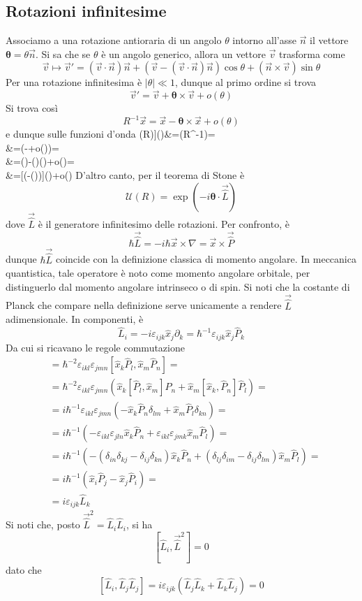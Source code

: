 \documentclass[a4paper, 11pt]{article}
\newcommand{\op}{\hat}
\newcommand{\Op}[1]{\vec{\hat{#1}}}
\def\bal#1\eal{\begin{align*}#1\end{align*}}
\newcommand{\1}{\mathbbm{1}}
\begin{document}
	\subsection{Rotazioni infinitesime}
	Associamo a una rotazione antioraria di un angolo $\theta$ intorno all'asse $\vec{n}$ il vettore $\bm{\theta}=\theta\vec{n}$. Si sa che se $\theta$ è un angolo generico, allora un vettore $\vec{v}$ trasforma come
	\[\vec v\mapsto\vec{v}'=(\vec{v}\cdot\vec{n})\vec{n}+(\vec{v}-(\vec{v}\cdot\vec{n})\vec{n})\cos\theta+(\vec{n}\times\vec{v})\sin\theta\]
	Per una rotazione infinitesima è $|\theta|\ll1$, dunque al primo ordine si trova
	\[\vec{v}'=\vec{v}+\bm{\theta}\times\vec{v}+o(\theta)\]
	Si trova così
	\[R^{-1}\vec{x}=\vec{x}-\bm{\theta}\times\vec{x}+o(\theta)\]
	e dunque sulle funzioni d'onda
	\bal
	[(R)\psi]()&=\psi(R^{-1})=\\&=\psi(-\bm\theta\times{}+o(\theta))=\\&=\psi()-(\bm\theta\times{})\cdot\nabla\psi()+o(\theta)=\\&=[(\1-\bm\theta\cdot(\times\nabla))\psi]()+o(\theta)
	\eal
	D'altro canto, per il teorema di Stone è
	\[\mathcal{U}(R)=\exp(-i\bm\theta\cdot\Op{L})\]
	dove $\Op{L}$ è il generatore infinitesimo delle rotazioni. Per confronto, è
	\[\hbar\Op{L}=-i\hbar\vec{x}\times\nabla=\vec{x}\times\Op{P}\]
	dunque $\hbar\Op{L}$ coincide con la definizione classica di momento angolare. In meccanica quantistica, tale operatore è noto come momento angolare orbitale, per distinguerlo dal momento angolare intrinseco o di spin. Si noti che la costante di Planck che compare nella definizione serve unicamente a rendere $\Op{L}$ adimensionale. In componenti, è
	\[\op L_i=-i\varepsilon_{ijk}\op x_j\partial_k=\hbar^{-1}\varepsilon_{ijk}\op x_j\op P_k\]
	Da cui si ricavano le regole commutazione
	\begin{align}
	[\op L_i,\op L_j]&=\hbar^{-2}\varepsilon_{ikl}\varepsilon_{jmn}[\op x_k\op P_l,\op x_m\op P_n]=\nonumber\\&=\hbar^{-2}\varepsilon_{ikl}\varepsilon_{jmn}\left(\op x_k[\op P_l,\op x_m]\op P_n+\op x_m[\op x_k,\op P_n]\op P_l\right)=\nonumber\\&=i\hbar^{-1}\varepsilon_{ikl}\varepsilon_{jmn}(-\op x_k\op P_n\delta_{lm}+\op x_m\op P_l\delta_{kn})=\nonumber\\&=i\hbar^{-1}(-\varepsilon_{ikl}\varepsilon_{jln}\op x_k\op P_n+\varepsilon_{ikl}\varepsilon_{jmk}\op x_m\op P_l)=\nonumber\\&=i\hbar^{-1}(-(\delta_{in}\delta_{kj}-\delta_{ij}\delta_{kn})\op x_k\op P_n+(\delta_{lj}\delta_{im}-\delta_{ij}\delta_{lm})\op x_m\op P_l)=\nonumber\\&=i\hbar^{-1}(\op x_i\op P_j-\op x_j\op P_i)=\nonumber\\&=i\varepsilon_{ijk}\op L_k\label{eq:commutation}
	\end{align}
	Si noti che, posto $\Op{L}^2=\op L_i\op L_i$, si ha
	\[[\op L_i,\Op{L}^2]=0\]
	dato che
	\[[\op L_i,\op L_j\op L_j]=i\varepsilon_{ijk}(\op L_j\op L_k+\op L_k\op L_j)=0\]
\end{document}
